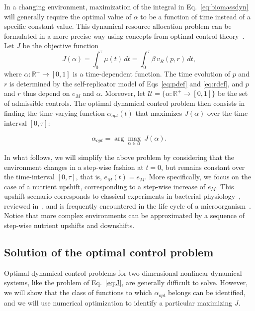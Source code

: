 In a changing environment, maximization of the integral in Eq.~\ref{eq:biomassdyn} will generally require the optimal value of $\alpha$ to be a function of time instead of a specific constant value.
This dynamical resource allocation problem can be formulated in a more precise way using concepts from optimal control theory~\cite{stengel_optimal_1994}. 
Let $J$ be the objective function  
\begin{equation*}
J(\alpha)= \int_{0}^{\tau} \mu(t) \, dt = \int_{0}^{\tau} \beta \, v_R(p,r) \, dt,
\end{equation*}
where $\alpha:\mathbb{R}^+ \rightarrow [0,1]$ is a time-dependent function. 
The time evolution of $p$ and $r$ is determined by the self-replicator model of Eqs~\ref{eq:pdef} and \ref{eq:rdef}, and $p$ and $r$ thus depend on $e_M$ and $\alpha$. 
Moreover, let $\mathcal{U}=\{\alpha:\mathbb{R}^+ \rightarrow [0,1] \}$ be the set of admissible controls. 
The optimal dynamical control problem then consists in finding the time-varying function $\alpha_{opt}(t)$ that maximizes $J(\alpha)$ over the time-interval $[0,\tau]$:

\begin{equation}
\alpha_{opt} = \arg \underset{\alpha \in \mathcal{U}}{\max} \ J(\alpha).
\label{eq:J}
\end{equation}

In what follows, we will simplify the above problem by considering that the environment changes in a step-wise fashion at $t=0$, but remains constant over the time-interval $[0,\tau]$, that is, $e_M(t)=e_M$.
More specifically, we focus on the case of a nutrient upshift, corresponding to a step-wise increase of $e_M$.
This upshift scenario corresponds to classical experiments in bacterial physiology~\cite{kjeldgaard_kinetics_1961,schaechter_patterns_1961,johnsen_control_1977}, reviewed in~\cite{ehrenberg_mediumdependent_2012}, and is frequently encountered in the life cycle of a microorganism~\cite{schaechter_microbe_2006}.
Notice that more complex environments can be approximated by a sequence of step-wise nutrient upshifts and downshifts.

\subsection*{Solution of the optimal control problem}
\label{sec:optimalcontrolsolution}

Optimal dynamical control problems for two-dimensional nonlinear dynamical systems, like the problem of Eq.~\ref{eq:J}, are generally difficult to solve.
However, we will show that the class of functions to which $\alpha_{opt}$ belongs can be identified, and we will use numerical optimization to identify a particular  maximizing $J$.

